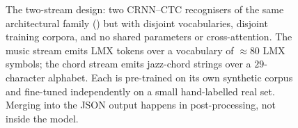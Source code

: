 \begin{figure}[htbp]
\caption[Two-stream lead-sheet recognition.]{%
  The two-stream design: two CRNN--CTC recognisers of the same
  architectural family () but with
  disjoint vocabularies, disjoint training corpora, and no shared
  parameters or cross-attention.  The music stream emits LMX tokens
  over a vocabulary of $\approx 80$ LMX symbols; the chord stream emits
  jazz-chord strings over a $29$-character alphabet.  Each is
  pre-trained on its own synthetic corpus and fine-tuned independently
  on a small hand-labelled real set. Merging into the JSON output
  happens in post-processing, not inside the model.}
\label{fig:two-stream-arch}
\end{figure}

